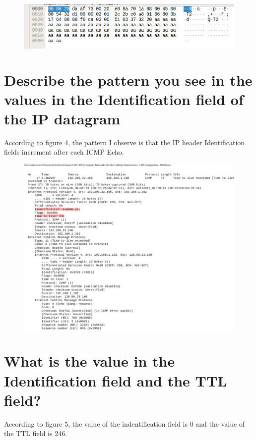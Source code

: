 \documentclass{article}
\begin{document}
\clearpage

\begin{figure}[h!]
\centering
\includegraphics[scale=0.5]{Q7.png}
\caption{}
\end{figure}

\section*{Describe the pattern you see in the values in the Identification field of the IP
datagram}
According to figure 4, the pattern I observe is that the IP header Identification fields increment after each ICMP Echo.\\

\begin{figure}[h!]
\centering
\includegraphics[scale=0.5]{Q8.pdf}
\caption{}
\end{figure}

\section*{What is the value in the Identification field and the TTL field?}
According to figure 5, the value of the indentification field is 0 and the value of the TTL field is 246.\\
\clearpage
\end{document}
